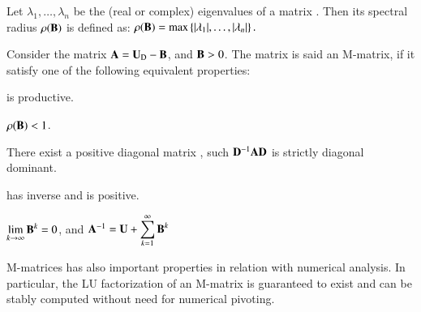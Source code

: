\documentclass{ecos2018}
\begin{document}
Let $\lambda _{1},\dotsc ,\lambda _{n}$ be the (real or complex) eigenvalues of a matrix . Then its spectral radius $\rho(\mathbf{B})$ is defined as:
\(\displaystyle \rho (\mathbf{B})=\max \left\{|\lambda _{1}|,\dotsc ,|\lambda _{n}|\right\}.\)

Consider the matrix $\mathbf{A}=\mathbf{U}_\mathrm{D}-\mathbf{B}$, and $\mathbf{B}>0$. The matrix  is said an M-matrix, if it satisfy one of the following equivalent properties:
\begin{compactenum}[(i)]
	\item {} is productive.
	\item $\rho(\mathbf{B})<1$.
	\item There exist a positive diagonal matrix , such $\mathbf{D}^{-1}\mathbf{A}\mathbf{D}$ is strictly diagonal dominant.
	\item {} has inverse and  is positive.
	\item $\displaystyle{\lim_{k\rightarrow\infty}\ensuremath{\mathbf{B}}^k=0}$, and 
	$\mathbf{A}^{-1}=\mathbf{U}+\displaystyle{\sum_{k=1}^{\infty}{\ensuremath{\mathbf{B}}^{k}}}$	
\end{compactenum}	
M-matrices has also important properties in relation with numerical analysis. In particular, the LU factorization of an M-matrix is guaranteed to exist and can be stably computed without need for numerical pivoting.
\end{document}
